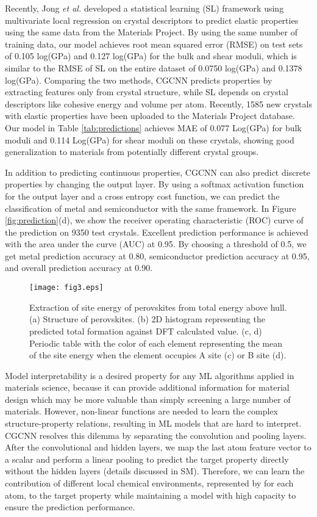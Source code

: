 \documentclass[twocolumn, prl]{revtex4-1}
\begin{document}
Recently, Jong \textit{et al.}\cite{de2016statistical} developed a statistical learning (SL) framework using multivariate local regression on crystal descriptors to predict elastic properties using the same data from the Materials Project. By using the same number of training data, our model achieves root mean squared error (RMSE) on test sets of 0.105 log(GPa) and 0.127 log(GPa) for the bulk and shear moduli, which is similar to the RMSE of SL on the entire dataset of 0.0750 log(GPa) and 0.1378 log(GPa). Comparing the two methods, CGCNN predicts properties by extracting features only from crystal structure, while SL depends on crystal descriptors like cohesive energy and volume per atom. Recently, 1585 new crystals with elastic properties have been uploaded to the Materials Project database. Our model in Table \ref{tab:predictions} achieves MAE of 0.077 Log(GPa) for bulk moduli and 0.114 Log(GPa) for shear moduli on these crystals, showing good generalization to materials from potentially different crystal groups.

In addition to predicting continuous properties, CGCNN can also predict discrete properties by changing the output layer. By using a softmax activation function for the output layer and a cross entropy cost function, we can predict the classification of metal and semiconductor with the same framework. In Figure \ref{fig:prediction}(d), we show the receiver operating characteristic (ROC) curve of the prediction on 9350 test crystals. Excellent prediction performance is achieved with the area under the curve (AUC) at 0.95. By choosing a threshold of 0.5, we get metal prediction accuracy at 0.80, semiconductor prediction accuracy at 0.95, and overall prediction accuracy at 0.90. 


\begin{figure}[tb]
  \centering
  \texttt{[image: fig3.eps]}
  \caption{Extraction of site energy of perovskites from total energy above hull. (a) Structure of perovskites. (b) 2D histogram representing the predicted total formation against DFT calculated value. (c, d) Periodic table with the color of each element representing the mean of the site energy when the element occupies A site (c) or B site (d). }
  \label{fig:perovskite}
\end{figure}


Model interpretability is a desired property for any ML algorithms applied in materials science, because it can provide additional information for material design which may be more valuable than simply screening a large number of materials. However, non-linear functions are needed to learn the complex structure-property relations, resulting in ML models that are hard to interpret. CGCNN resolves this dilemma by separating the convolution and pooling layers. After the  convolutional and  hidden layers, we map the last atom feature vector  to a scalar  and perform a linear pooling to predict the target property directly without the  hidden layers (details discussed in SM). Therefore, we can learn the contribution of different local chemical environments, represented by  for each atom, to the target property while maintaining a model with high capacity to ensure the prediction performance. 
\end{document}
